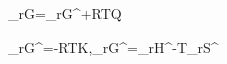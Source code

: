\Delta_rG=\Delta_rG^\circ+RT\ln Q

\Delta_rG^\circ=-RT\ln K,\qquad\Delta_rG^\circ=\Delta_rH^\circ-T\Delta_rS^\circ
